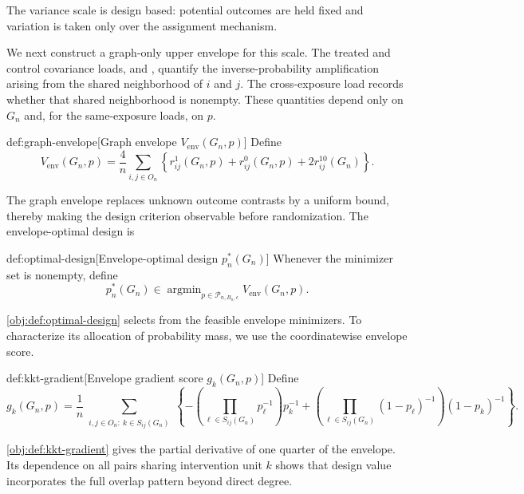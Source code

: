 \documentclass[11pt]{article}
\begin{document}
The variance scale  is design based: potential outcomes are held fixed and variation is taken only over the assignment mechanism.

We next construct a graph-only upper envelope for this scale. The treated and control covariance loads,  and , quantify the inverse-probability amplification arising from the shared neighborhood of \(i\) and \(j\). The cross-exposure load  records whether that shared neighborhood is nonempty. These quantities depend only on \(G_n\) and, for the same-exposure loads, on \(p\).

\begin{definitionv}{def:graph-envelope}[Graph envelope $V_{\mathrm{env}}(G_n,p)$]
Define
\[
V_{\mathrm{env}}(G_n,p)
=
\frac{4}{n}\sum_{i,j\in O_n}
\left\{
r_{ij}^1(G_n,p)
+
r_{ij}^0(G_n,p)
+
2r_{ij}^{10}(G_n)
\right\}.
\]
\end{definitionv}

The graph envelope  replaces unknown outcome contrasts by a uniform bound, thereby making the design criterion observable before randomization. The envelope-optimal design is

\begin{definitionv}{def:optimal-design}[Envelope-optimal design $p_n^*(G_n)$]
Whenever the minimizer set is nonempty, define
\[
p_n^*(G_n)
\in
\operatorname{argmin}_{p\in\mathcal P_{n,B_n,\epsilon}}
V_{\mathrm{env}}(G_n,p).
\]
\end{definitionv}

\cref{obj:def:optimal-design} selects  from the feasible envelope minimizers. To characterize its allocation of probability mass, we use the coordinatewise envelope score.

\begin{definitionv}{def:kkt-gradient}[Envelope gradient score $g_k(G_n,p)$]
Define
\[
g_k(G_n,p)
=
\frac{1}{n}
\sum_{\substack{i,j\in O_n:\ k\in S_{ij}(G_n)}}
\left\{
-
\left(\prod_{\ell\in S_{ij}(G_n)}p_\ell^{-1}\right)p_k^{-1}
+
\left(\prod_{\ell\in S_{ij}(G_n)}(1-p_\ell)^{-1}\right)(1-p_k)^{-1}
\right\}.
\]
\end{definitionv}

\cref{obj:def:kkt-gradient} gives the partial derivative of one quarter of the envelope. Its dependence on all pairs sharing intervention unit \(k\) shows that design value incorporates the full overlap pattern beyond direct degree.
\end{document}
